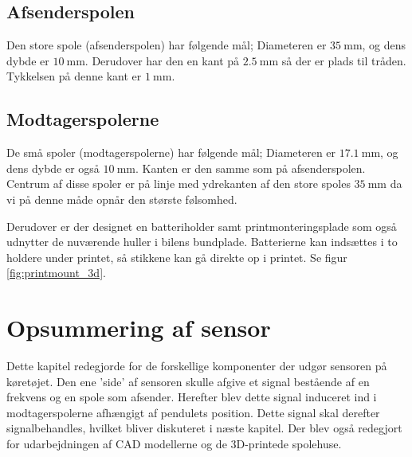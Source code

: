 \subsection{Afsenderspolen}
Den store spole (afsenderspolen) har følgende mål; 
Diameteren er $\SI{35}{\milli\meter}$, og dens dybde er $\SI{10}{\milli\meter}$. Derudover har den en kant på $\SI{2.5}{\milli\meter}$ så der er plads til tråden. Tykkelsen på denne kant er $\SI{1}{\milli\meter}$. 

\subsection{Modtagerspolerne}
De små spoler (modtagerspolerne) har følgende mål; 
Diameteren er $\SI{17.1}{\milli\meter}$, og dens dybde er også $\SI{10}{\milli\meter}$. Kanten er den samme som på afsenderspolen. Centrum af disse spoler er på linje med ydrekanten af den store spoles $\SI{35}{\milli\meter}$ da vi på denne måde opnår den største følsomhed. 

Derudover er der designet en batteriholder samt printmonteringsplade som også udnytter de nuværende huller i bilens bundplade. Batterierne kan indsættes i to holdere under printet, så stikkene kan gå direkte op i printet. Se figur \ref{fig:printmount_3d}.

\section{Opsummering af sensor}
Dette kapitel redegjorde for de forskellige komponenter der udgør sensoren på køretøjet. Den ene 'side' af sensoren skulle afgive et signal bestående af en frekvens og en spole som afsender. Herefter blev dette signal induceret ind i modtagerspolerne afhængigt af pendulets position. Dette signal skal derefter signalbehandles, hvilket bliver diskuteret i næste kapitel. Der blev også redegjort for udarbejdningen af CAD modellerne og de 3D-printede spolehuse.